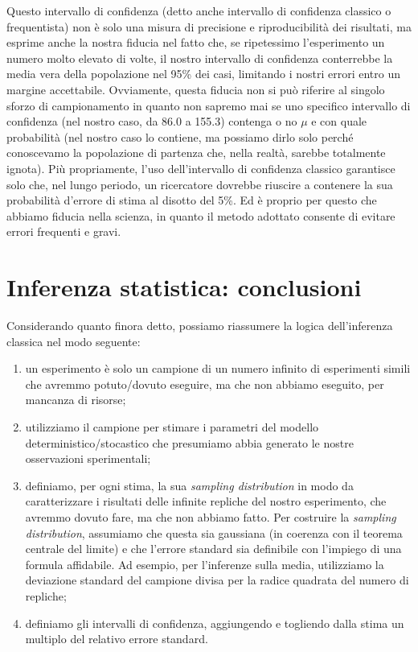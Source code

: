 \documentclass[a4paper,12pt,oneside]{book}
\providecommand{\tightlist}{%
  \setlength{\itemsep}{0pt}\setlength{\parskip}{0pt}}
\begin{document}
Questo intervallo di confidenza (detto anche intervallo di confidenza classico o frequentista) non è solo una misura di precisione e riproducibilità dei risultati, ma esprime anche la nostra fiducia nel fatto che, se ripetessimo l'esperimento un numero molto elevato di volte, il nostro intervallo di confidenza conterrebbe la media vera della popolazione nel 95\% dei casi, limitando i nostri errori entro un margine accettabile. Ovviamente, questa fiducia non si può riferire al singolo sforzo di campionamento in quanto non sapremo mai se uno specifico intervallo di confidenza (nel nostro caso, da 86.0 a 155.3) contenga o no \(\mu\) e con quale probabilità (nel nostro caso lo contiene, ma possiamo dirlo solo perché conoscevamo la popolazione di partenza che, nella realtà, sarebbe totalmente ignota). Più propriamente, l'uso dell'intervallo di confidenza classico garantisce solo che, nel lungo periodo, un ricercatore dovrebbe riuscire a contenere la sua probabilità d'errore di stima al disotto del 5\%. Ed è proprio per questo che abbiamo fiducia nella scienza, in quanto il metodo adottato consente di evitare errori frequenti e gravi.

\hypertarget{inferenza-statistica-conclusioni}{%
\section{Inferenza statistica: conclusioni}\label{inferenza-statistica-conclusioni}}

Considerando quanto finora detto, possiamo riassumere la logica dell'inferenza classica nel modo seguente:

\begin{enumerate}
\def\labelenumi{\arabic{enumi}.}
\tightlist
\item
  un esperimento è solo un campione di un numero infinito di esperimenti simili che avremmo potuto/dovuto eseguire, ma che non abbiamo eseguito, per mancanza di risorse;
\item
  utilizziamo il campione per stimare i parametri del modello deterministico/stocastico che presumiamo abbia generato le nostre osservazioni sperimentali;
\item
  definiamo, per ogni stima, la sua \emph{sampling distribution} in modo da caratterizzare i risultati delle infinite repliche del nostro esperimento, che avremmo dovuto fare, ma che non abbiamo fatto. Per costruire la \emph{sampling distribution}, assumiamo che questa sia gaussiana (in coerenza con il teorema centrale del limite) e che l'errore standard sia definibile con l'impiego di una formula affidabile. Ad esempio, per l'inferenze sulla media, utilizziamo la deviazione standard del campione divisa per la radice quadrata del numero di repliche;
\item
  definiamo gli intervalli di confidenza, aggiungendo e togliendo dalla stima un multiplo del relativo errore standard.
\end{enumerate}
\end{document}
